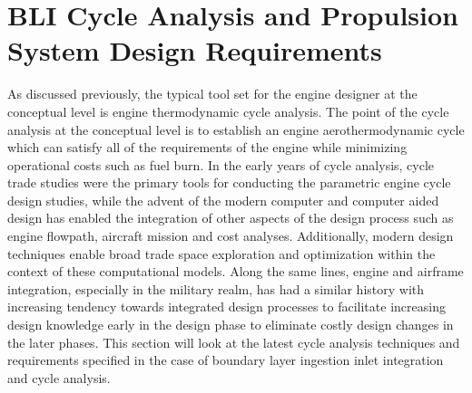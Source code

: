 \section{BLI Cycle Analysis and Propulsion System Design Requirements}
	As discussed previously, the typical tool set for the engine designer at the conceptual level is engine thermodynamic cycle analysis.  The point of the cycle analysis at the conceptual level is to establish an engine aerothermodynamic cycle which can satisfy all of the requirements of the engine while minimizing operational costs such as fuel burn.  In the early years of cycle analysis, cycle trade studies were the primary tools for conducting the parametric engine cycle design studies, while the advent of the modern computer and computer aided design has enabled the integration of other aspects of the design process such as engine flowpath, aircraft mission and cost analyses.  Additionally, modern design techniques enable broad trade space exploration and optimization within the context of these computational models.  Along the same lines, engine and airframe integration, especially in the military realm, has had a similar history with increasing tendency towards integrated design processes to facilitate increasing design knowledge early in the design phase to eliminate costly design changes in the later phases.  This section will look at the latest cycle analysis techniques and requirements specified in the case of boundary layer ingestion inlet integration and cycle analysis.  

